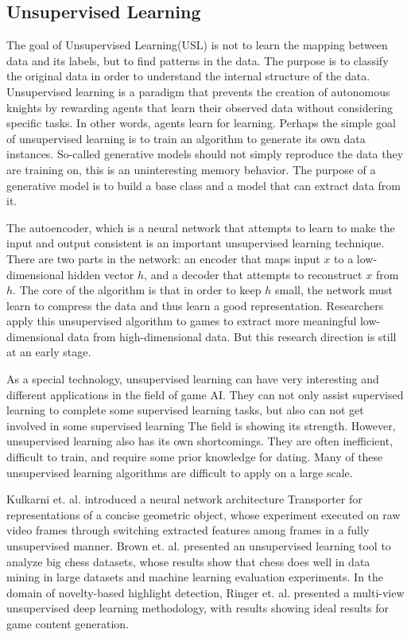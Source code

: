 \documentclass[11pt,en]{elegantpaper}
\begin{document}
\subsection{Unsupervised Learning}
The goal of Unsupervised Learning(USL) is not to learn the mapping between data and its labels, but to find patterns in the data. The purpose is to classify the original data in order to understand the internal structure of the data. Unsupervised learning is a paradigm that prevents the creation of autonomous knights by rewarding agents that learn their observed data without considering specific tasks. In other words, agents learn for learning. Perhaps the simple goal of unsupervised learning is to train an algorithm to generate its own data instances. So-called generative models should not simply reproduce the data they are training on, this is an uninteresting memory behavior. The purpose of a generative model is to build a base class and a model that can extract data from it.

The autoencoder, which is a neural network that attempts to learn to make the input and output consistent is an important unsupervised learning technique. There are two parts in the network: an encoder that maps input $x$ to a low-dimensional hidden vector $h$, and a decoder that attempts to reconstruct $x$ from $h$. The core of the algorithm is that in order to keep $h$ small, the network must learn to compress the data and thus learn a good representation. Researchers apply this unsupervised algorithm to games to extract more meaningful low-dimensional data from high-dimensional data. But this research direction is still at an early stage.

As a special technology, unsupervised learning can have very interesting and different applications in the field of game AI. They can not only assist supervised learning to complete some supervised learning tasks, but also can not get involved in some supervised learning The field is showing its strength. However, unsupervised learning also has its own shortcomings. They are often inefficient, difficult to train, and require some prior knowledge for dating. Many of these unsupervised learning algorithms are difficult to apply on a large scale.

Kulkarni et. al.\cite{b1} introduced a neural network architecture Transporter for representations of a concise geometric object, whose experiment executed on raw video frames through switching extracted features among frames in a fully unsupervised manner. Brown et. al.\cite{b2} presented an unsupervised learning tool to analyze big chess datasets, whose results show that chess does well in data mining in large datasets and machine learning evaluation experiments. In the domain of novelty-based highlight detection, Ringer et. al. \cite{b3} presented a multi-view unsupervised deep learning methodology, with results showing ideal results for game content generation.
\end{document}
